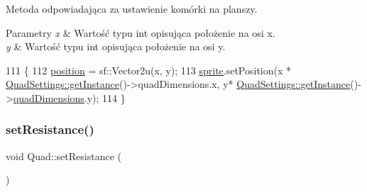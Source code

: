 Metoda odpowiadająca za ustawienie komórki na planszy. 
\begin{DoxyParams}{Parametry}
{\em x} & Wartość typu int opisująca położenie na osi x. \\
\hline
{\em y} & Wartość typu int opisująca położenie na osi y. \\
\hline
\end{DoxyParams}

\begin{DoxyCode}
111 \{
112     \mbox{\hyperlink{class_quad_af0820dc173ffac240bcfe0a19dc2fe8a}{position}} = sf::Vector2u(x, y);
113     \mbox{\hyperlink{class_quad_a83667bb824c1d6eca6c9c8b6e6d07d06}{sprite}}.setPosition(x * \mbox{\hyperlink{class_quad_settings_a20d7cfd0c56c11adcdf75c5e3011de67}{QuadSettings::getInstance}}()->quadDimensions.x, y*
       \mbox{\hyperlink{class_quad_settings_a20d7cfd0c56c11adcdf75c5e3011de67}{QuadSettings::getInstance}}()->\mbox{\hyperlink{class_quad_settings_abb4a967873d7a93098ef168b894280d6}{quadDimensions}}.y);
114 \}
\end{DoxyCode}
\mbox{\label{class_quad_a92ac7d4d3d789cce9339eadc77fd8185}} 
\subsubsection{\texorpdfstring{set\+Resistance()}{setResistance()}}
{\footnotesize\ttfamily void Quad\+::set\+Resistance (\begin{DoxyParamCaption}{ }\end{DoxyParamCaption})\hspace{0.3cm}{\ttfamily [private]}}

